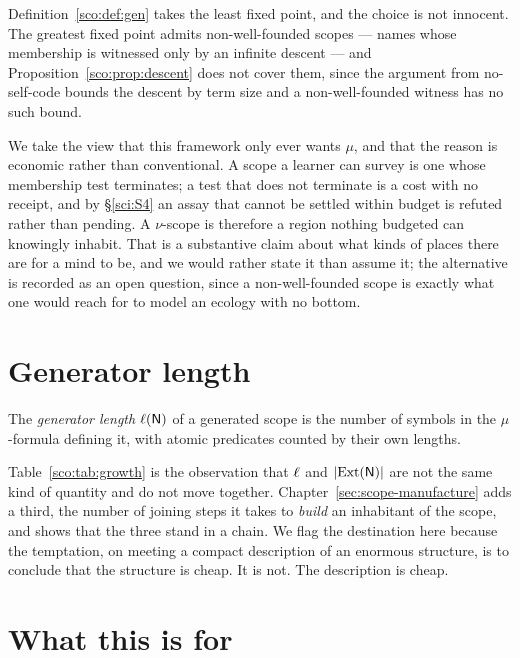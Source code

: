 \begin{remark}
\label{sco:rmk:munu}
Definition~\ref{sco:def:gen} takes the least fixed point, and the choice
is not innocent. The greatest fixed point admits non-well-founded scopes
--- names whose membership is witnessed only by an infinite descent ---
and Proposition~\ref{sco:prop:descent} does not cover them, since the
argument from no-self-code bounds the descent by term size and a
non-well-founded witness has no such bound.

We take the view that this framework only ever wants $\mu$, and that the
reason is economic rather than conventional. A scope a learner can survey
is one whose membership test terminates; a test that does not terminate is
a cost with no receipt, and by \S\ref{sci:S4} an assay that cannot be
settled within budget is refuted rather than pending. A $\nu$-scope is
therefore a region nothing budgeted can knowingly inhabit. That is a
substantive claim about what kinds of places there are for a mind to be,
and we would rather state it than assume it; the alternative is recorded
as an open question, since a non-well-founded scope is exactly what one
would reach for to model an ecology with no bottom.
\end{remark}

\section{Generator length}
\label{sco:sec:genlen}

\begin{definition}
\label{sco:def:genlen}
The \emph{generator length} $\ell(\mathsf{N})$ of a generated scope is the
number of symbols in the $\mu$-formula defining it, with atomic predicates
counted by their own lengths.
\end{definition}

Table~\ref{sco:tab:growth} is the observation that $\ell$ and
$|\mathrm{Ext}(\mathsf{N})|$ are not the same kind of quantity and do not move together.
Chapter~\ref{sec:scope-manufacture} adds a third, the number of joining
steps it takes to \emph{build} an inhabitant of the scope, and shows that
the three stand in a chain. We flag the destination here because the
temptation, on meeting a compact description of an enormous structure, is
to conclude that the structure is cheap. It is not. The description is
cheap.

\section{What this is for}

